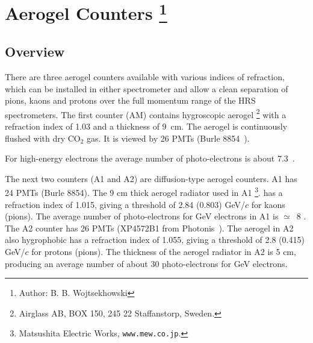 \chapter[Aerogel \Cherenkov{} Counter]{Aerogel \Cherenkov{} Counters
\footnote{Author: B. B. Wojtsekhowski }
}
\label{chap:hrs-aerogel}

\section{Overview}

There are three aerogel \Cherenkov{} counters available with various indices
of refraction, which can be installed in either spectrometer 
and allow a clean separation of pions, kaons and protons over 
the full momentum range of the HRS spectrometers.
The first counter (AM) contains hygroscopic aerogel%
\footnote{Airglass AB, BOX 150, 245 22 Staffanstorp, Sweden.}
with a refraction index of 1.03 and a thickness of 9~cm. 
The aerogel is continuously flushed with dry CO$_{2}$ gas.  
It is viewed by 26 PMTs (Burle 8854~\cite{BurleInd}).

For high-energy electrons the average 
number of photo-electrons is about 7.3~\cite{Brash:2002vn}.

The next two counters (A1 and A2) are diffusion-type aerogel counters.
A1 has 24 PMTs (Burle 8854). The 9 cm thick aerogel radiator used in A1
\footnote{ Matsushita Electric Works, {\tt www.mew.co.jp}.}.
has a refraction index of 1.015, giving a threshold of 2.84 (0.803) GeV/$c$ for
kaons (pions). The average number of photo-electrons for GeV electrons
in A1 is $\simeq$~8%
.
 The A2 counter has 26 PMTs
(XP4572B1 from Photonis~\cite{PhotonisInd}).
The aerogel in A2 also hygrophobic has a refraction index of 1.055, 
giving a threshold of 2.8 (0.415) GeV/$c$ for protons (pions). 
The thickness of the aerogel radiator in A2 is 5 cm, producing an average
number of about 30 photo-electrons for GeV electrons.

